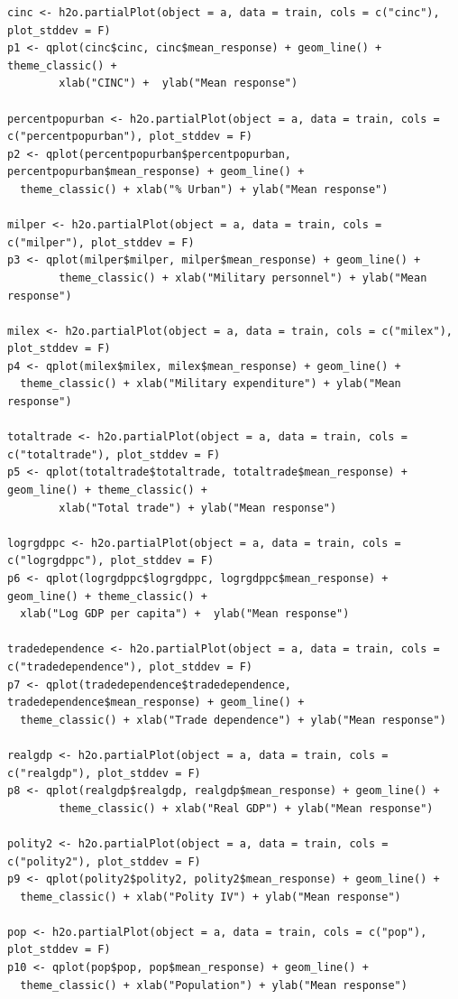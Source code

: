 \documentclass[a4paper,12pt]{article}
\begin{document}
\begin{verbatim}
cinc <- h2o.partialPlot(object = a, data = train, cols = c("cinc"), plot_stddev = F)
p1 <- qplot(cinc$cinc, cinc$mean_response) + geom_line() + theme_classic() + 
        xlab("CINC") +  ylab("Mean response")

percentpopurban <- h2o.partialPlot(object = a, data = train, cols = c("percentpopurban"), plot_stddev = F)
p2 <- qplot(percentpopurban$percentpopurban, percentpopurban$mean_response) + geom_line() +
  theme_classic() + xlab("% Urban") + ylab("Mean response")

milper <- h2o.partialPlot(object = a, data = train, cols = c("milper"), plot_stddev = F)
p3 <- qplot(milper$milper, milper$mean_response) + geom_line() +
        theme_classic() + xlab("Military personnel") + ylab("Mean response")

milex <- h2o.partialPlot(object = a, data = train, cols = c("milex"), plot_stddev = F)
p4 <- qplot(milex$milex, milex$mean_response) + geom_line() +
  theme_classic() + xlab("Military expenditure") + ylab("Mean response")

totaltrade <- h2o.partialPlot(object = a, data = train, cols = c("totaltrade"), plot_stddev = F)
p5 <- qplot(totaltrade$totaltrade, totaltrade$mean_response) + geom_line() + theme_classic() +
        xlab("Total trade") + ylab("Mean response")

logrgdppc <- h2o.partialPlot(object = a, data = train, cols = c("logrgdppc"), plot_stddev = F)
p6 <- qplot(logrgdppc$logrgdppc, logrgdppc$mean_response) + geom_line() + theme_classic() +
  xlab("Log GDP per capita") +  ylab("Mean response")

tradedependence <- h2o.partialPlot(object = a, data = train, cols = c("tradedependence"), plot_stddev = F)
p7 <- qplot(tradedependence$tradedependence, tradedependence$mean_response) + geom_line() +
  theme_classic() + xlab("Trade dependence") + ylab("Mean response")

realgdp <- h2o.partialPlot(object = a, data = train, cols = c("realgdp"), plot_stddev = F)
p8 <- qplot(realgdp$realgdp, realgdp$mean_response) + geom_line() +
        theme_classic() + xlab("Real GDP") + ylab("Mean response")

polity2 <- h2o.partialPlot(object = a, data = train, cols = c("polity2"), plot_stddev = F)
p9 <- qplot(polity2$polity2, polity2$mean_response) + geom_line() +
  theme_classic() + xlab("Polity IV") + ylab("Mean response")

pop <- h2o.partialPlot(object = a, data = train, cols = c("pop"), plot_stddev = F)
p10 <- qplot(pop$pop, pop$mean_response) + geom_line() +
  theme_classic() + xlab("Population") + ylab("Mean response")


\end{verbatim}
\end{document}

